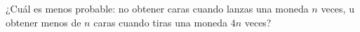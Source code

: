 \begin{statement}{26}
  ¿Cu\'al es menos probable: no obtener caras cuando lanzas una moneda $n$ veces, u
  obtener menos de $n$ caras cuando tiras una moneda $4n$ veces?
\end{statement}